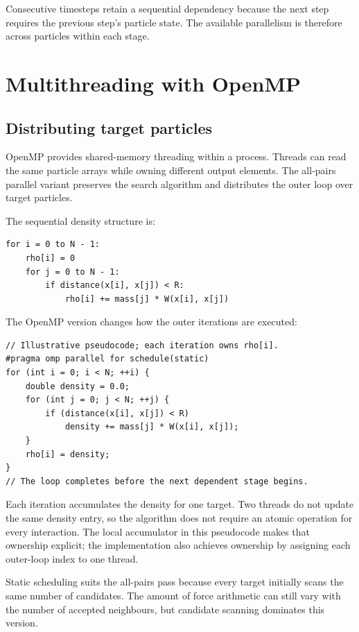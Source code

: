 \documentclass[
  11pt,
]{article}
\begin{document}
Consecutive timesteps retain a sequential dependency because the next
step requires the previous step's particle state. The available
parallelism is therefore across particles within each stage.

\section{Multithreading with OpenMP}\label{multithreading-with-openmp}

\subsection{Distributing target
particles}\label{distributing-target-particles}

OpenMP provides shared-memory threading within a process. Threads can
read the same particle arrays while owning different output elements.
The all-pairs parallel variant preserves the search algorithm and
distributes the outer loop over target particles.

The sequential density structure is:

\begin{verbatim}
for i = 0 to N - 1:
    rho[i] = 0
    for j = 0 to N - 1:
        if distance(x[i], x[j]) < R:
            rho[i] += mass[j] * W(x[i], x[j])
\end{verbatim}

The OpenMP version changes how the outer iterations are executed:

\begin{verbatim}
// Illustrative pseudocode; each iteration owns rho[i].
#pragma omp parallel for schedule(static)
for (int i = 0; i < N; ++i) {
    double density = 0.0;
    for (int j = 0; j < N; ++j) {
        if (distance(x[i], x[j]) < R)
            density += mass[j] * W(x[i], x[j]);
    }
    rho[i] = density;
}
// The loop completes before the next dependent stage begins.
\end{verbatim}

Each iteration accumulates the density for one target. Two threads do
not update the same density entry, so the algorithm does not require an
atomic operation for every interaction. The local accumulator in this
pseudocode makes that ownership explicit; the implementation also
achieves ownership by assigning each outer-loop index to one thread.

Static scheduling suits the all-pairs pass because every target
initially scans the same number of candidates. The amount of force
arithmetic can still vary with the number of accepted neighbours, but
candidate scanning dominates this version.
\end{document}
